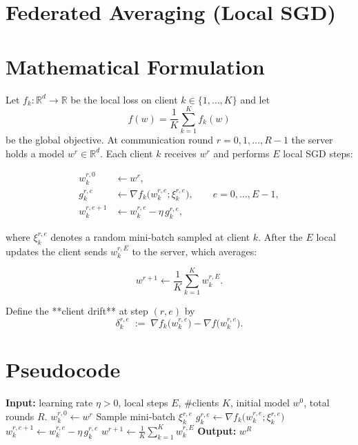 \documentclass{article}
\newcommand{\RR}{\mathbb{R}}
\begin{document}
\section*{Federated Averaging (Local SGD)}

\section*{Mathematical Formulation}
Let $f_k:\RR^d\!\to\!\RR$ be the local loss on client $k\in\{1,\dots,K\}$ and let 
\[
f(w)=\frac1K\sum_{k=1}^K f_k(w)
\]
be the global objective.  
At communication round $r=0,1,\dots,R-1$ the server holds a model $w^{r}\in\RR^d$.
Each client $k$ receives $w^{r}$ and performs $E$ local SGD steps:

\[
\begin{aligned}
w_{k}^{r,0} &\gets w^{r},\\
g_{k}^{r,e} &\gets \nabla f_k\!\bigl(w_{k}^{r,e};\xi_{k}^{r,e}\bigr),\qquad e=0,\dots,E-1,\\
w_{k}^{r,e+1} &\gets w_{k}^{r,e}-\eta\, g_{k}^{r,e},
\end{aligned}
\tag{1}
\]

where $\xi_{k}^{r,e}$ denotes a random mini‑batch sampled at client $k$.
After the $E$ local updates the client sends $w_{k}^{r,E}$ to the server, which averages:

\[
w^{r+1}\gets \frac1K\sum_{k=1}^K w_{k}^{r,E}. \tag{2}
\]

Define the **client drift** at step $(r,e)$ by
\[
\delta_{k}^{r,e}\;:=\;\nabla f_k\!\bigl(w_{k}^{r,e}\bigr)-\nabla f\!\bigl(w_{k}^{r,e}\bigr). \tag{3}
\]

\section*{Pseudocode}
\begin{algorithm}[H]
\caption{Federated Averaging (Local SGD)}
\begin{algorithmic}[1]
\State \textbf{Input:} learning rate $\eta>0$, local steps $E$, #clients $K$,
initial model $w^{0}$, total rounds $R$.
        \State $w_{k}^{r,0}\gets w^{r}$
            \State Sample mini‑batch $\xi_{k}^{r,e}$
            \State $g_{k}^{r,e}\gets \nabla f_k\!\bigl(w_{k}^{r,e};\xi_{k}^{r,e}\bigr)$
            \State $w_{k}^{r,e+1}\gets w_{k}^{r,e}-\eta\, g_{k}^{r,e}$
        \EndFor
    \EndFor
    \State $w^{r+1}\gets \frac1K\sum_{k=1}^{K} w_{k}^{r,E}$ 
\EndFor
\State \textbf{Output:} $w^{R}$
\end{algorithmic}
\end{algorithm}
\end{document}
